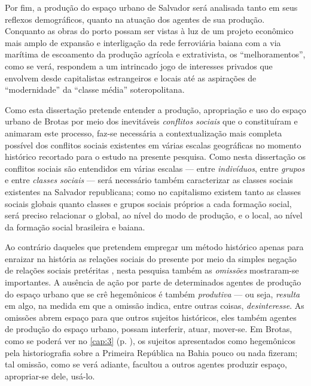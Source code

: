 Por fim, a produção do espaço urbano de Salvador será analisada tanto em seus reflexos demográficos, quanto na atuação dos agentes de sua produção. Conquanto as obras do porto possam ser vistas à luz de um projeto econômico mais amplo de expansão e interligação da rede ferroviária baiana com a via marítima de escoamento da produção agrícola e extrativista, os ``melhoramentos'', como se verá, respondem a um intrincado jogo de interesses privados que envolvem desde capitalistas estrangeiros e locais até as aspirações de ``modernidade'' da ``classe média'' soteropolitana.

Como esta dissertação pretende entender a produção, apropriação e uso do espaço urbano de Brotas por meio dos inevitáveis \textit{conflitos sociais} que o constituíram e animaram este processo, faz-se necessária a contextualização mais completa possível dos conflitos sociais existentes em várias escalas geográficas no momento histórico recortado para o estudo na presente pesquisa. Como nesta dissertação os conflitos sociais são entendidos em várias escalas --- entre \textit{indivíduos}, entre \textit{grupos} e entre \textit{classes sociais} --- será necessário também caracterizar as classes sociais existentes na Salvador republicana; como no capitalismo existem tanto as classes sociais globais quanto classes e grupos sociais próprios a cada formação social, será preciso relacionar o global, ao nível do modo de produção, e o local, ao nível da formação social brasileira e baiana.

Ao contrário daqueles que pretendem empregar um método histórico apenas para enraizar na história as relações sociais do presente por meio da simples negação de relações sociais pretéritas \cite{machado_harxhist_2018}, nesta pesquisa também as \textit{omissões} mostraram-se importantes. A ausência de ação por parte de determinados agentes de produção do espaço urbano que se crê hegemônicos é também \textit{produtiva} --- ou seja, \textit{resulta} em algo, na medida em que a omissão indica, entre outras coisas, \textit{desinteresse}. As omissões abrem espaço para que outros sujeitos históricos, eles também agentes de produção do espaço urbano, possam interferir, atuar, mover-se. Em Brotas, como se poderá ver no \autoref{cap:3} (p. \pageref{cap:3}), os sujeitos apresentados como hegemônicos pela historiografia sobre a Primeira República na Bahia pouco ou nada fizeram; tal omissão, como se verá adiante, facultou a outros agentes produzir espaço, apropriar-se dele, usá-lo.






% 